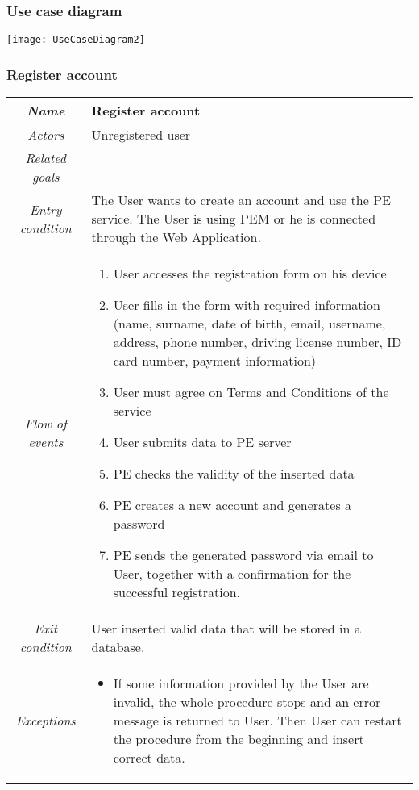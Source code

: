 \subsubsection{Use case diagram}
\texttt{[image: UseCaseDiagram2]}


\subsubsection{Register account}

\begin{center}
	\begin{tabular}{c | p{} }
		\hline
		\textit{Name} &    Register account \\
		\hline
		\textit{Actors} & 	Unregistered user \\
		\hline
		\textit{Related goals} & \\ 								
		\hline
		\textit{Entry condition} & 	The User wants to create an account and use the PE service. The User is using PEM or he is connected through the Web Application.  \\
		\hline
		\textit{Flow of events} & 
		\begin{enumerate}
			\item User accesses the registration form on his device
			\item User fills in the form with required information (name, surname, date of birth, email, username, address, phone number, driving license number, ID card number, payment information)
			\item User must agree on Terms and Conditions of the service
			\item User submits data to PE server
			\item PE checks the validity of the inserted data
			\item PE creates a new account and generates a password
			\item PE sends the generated password via email to User, together with a confirmation for the successful registration.
		\end{enumerate}
		\\
		\hline
		\textit{Exit condition} &  User inserted valid data that will be stored in a database.  \\
		\hline
		\textit{Exceptions} & 
		\begin{itemize}
			\item If some information provided by the User are invalid, the whole procedure stops and an error message is returned to User. Then User can restart the procedure from the beginning and insert correct data.

\end{itemize}
\end{tabular}
\end{center}
